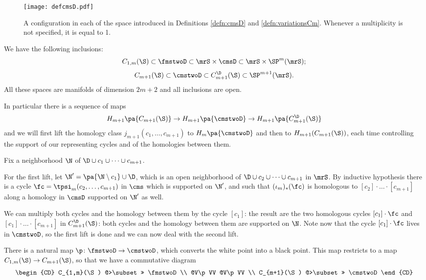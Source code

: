 \begin{figure}\centering
 \texttt{[image: defcmsD.pdf]}
 \caption{A configuration in each of the space introduced in Definitions \ref{defn:cmsD} and \ref{defn:variationsCm}.
 Whenever a multiplicity is not specified, it is equal to 1.}
\label{fig:defcmsD}
\end{figure}

 
We have the following inclusions:
\[
C_{1,m}(\S)\subset\fmstwoD\subset\mrS\times\cmsD\subset\mrS\times\SP^m(\mrS);
\]
\[
C_{m+1}(\S)\subset\cmstwoD\subset C_{m+1}^{\D}(\S)\subset\SP^{m+1}(\mrS).
\]
All these spaces are
manifolds of dimension $2m+2$ and all inclusions are open.

In particular there is a sequence of maps
\[
 H_{m+1}\pa{C_{m+1}(\S)}\to H_{m+1}\pa{\cmstwoD}\to H_{m+1}\pa{C_{m+1}^{\D}(\S)}
\]
and we will first lift the homology class $j_{m+1}(c_1,\dots,c_{m+1})$ to $H_m\pa{\cmstwoD}$ and
then to $H_{m+1}(C_{m+1}(\S))$, each time controlling the support of our representing
cycles and of the homologies between them.

Fix a neighborhood $\N$ of $\D\cup c_1\cup\dots\cup c_{m+1}$.

For the first lift, let $\N'=\pa{\N\setminus c_1}\cup\D$, which is an open
neighborhood of $\D\cup c_2\cup\dots\cup c_{m+1}$ in $\mrS$. By inductive hypothesis
there is a cycle $\fc=\tpsi_m(c_2,\dots,c_{m+1})$ in $\cms$ which is supported on $\N'$,
and such that $(\iota_m)_*(\fc)$ is homologous to $[c_2]\cdot\ldots\cdot[c_{m+1}]$
along a homology in $\cmsD$ supported on $\N'$ as well.

We can multiply both
cycles and the homology between them by the cycle $[c_1]$: the result are the two homologous cycles
$[c_1]\cdot \fc$ and $[c_1]\cdot\ldots\cdot[c_{m+1}]$ in $C_{m+1}^{\D}(\S)$: both cycles and the
homology between them are supported on $\N$. Note now that the
cycle $[c_1]\cdot\fc$ lives in $\cmstwoD$, so the first lift is done and we can now
deal with the second lift.

There is a natural map $\p\colon \fmstwoD\to \cmstwoD$, which converts the white point
into a black point. This map restricts to %
a map $C_{1,m}(\S)\to C_{m+1}(\S)$, so that
we have a commutative diagram
 \begin{equation}\label{eq:cmstwodiagram}
  \begin{CD}
   C_{1,m}(\S) @>\subset >> \fmstwoD
\\   @V\p VV @V\p VV
\\   C_{m+1}(\S) @>\subset >> \cmstwoD
   \end{CD}
\end{equation}

